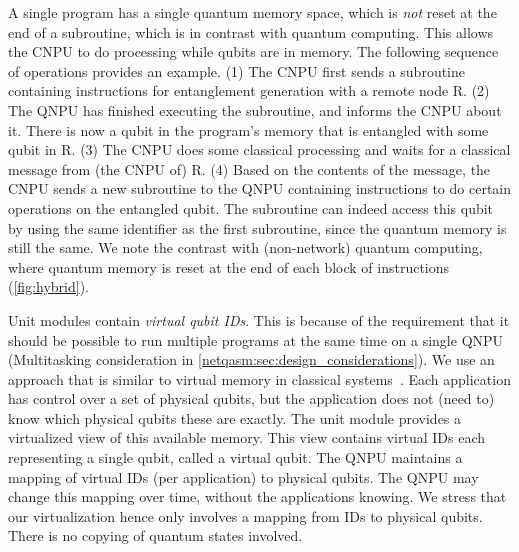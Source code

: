 A single program has a single quantum memory space, which is \textit{not} reset at the end of a subroutine, which is in contrast with quantum computing.
This allows the \ac{CNPU} to do processing while qubits are in memory.
The following sequence of operations provides an example.
    (1) The \ac{CNPU} first sends a subroutine containing instructions for entanglement generation with a remote node R.
    (2) The \ac{QNPU} has finished executing the subroutine, and informs the \ac{CNPU} about it.
        There is now a qubit in the program's memory that is entangled with some qubit in R.
    (3) The \ac{CNPU} does some classical processing and waits for a classical message from (the \ac{CNPU} of) R.
    (4) Based on the contents of the message, the \ac{CNPU} sends a new subroutine to the \ac{QNPU} containing instructions to do certain operations on the entangled qubit.
        The subroutine can indeed access this qubit by using the same identifier as the first subroutine, since the quantum memory is still the same.
        We note the contrast with (non-network) quantum computing, where quantum memory is reset at the end of each block of instructions (\cref{fig:hybrid}).


Unit modules contain \textit{virtual qubit IDs}.
This is because of the requirement that it should be possible to run multiple programs at the same time on a single \ac{QNPU} (Multitasking consideration in \cref{netqasm:sec:design_considerations}).
We use an approach that is similar to virtual memory in classical systems~\cite{arpaci2018operating}.
Each application has control over a set of physical qubits, but the application does not (need to) know which physical qubits these are exactly.
The unit module provides a virtualized view of this available memory.
This view contains virtual IDs each representing a single qubit, called a virtual qubit.
The \ac{QNPU} maintains a mapping of virtual IDs (per application) to physical qubits.
The \ac{QNPU} may change this mapping over time, without the applications knowing.
We stress that our virtualization hence only involves a mapping from IDs to physical qubits.
There is no copying of quantum states involved.


